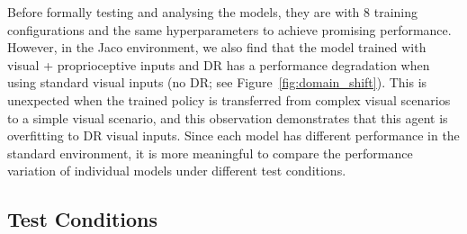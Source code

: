 Before formally testing and analysing the models, they are  with 8 training configurations and the same hyperparameters to achieve promising performance. However, in the Jaco environment, we also find that the model trained with visual + proprioceptive inputs and DR has a performance degradation when using standard visual inputs (no DR; see Figure~\ref{fig:domain_shift}). This is unexpected when the trained policy is transferred from complex visual scenarios to a simple visual scenario, and this observation demonstrates that this agent is overfitting to DR visual inputs. Since each model has different performance in the standard environment, it is more meaningful to compare the performance variation of individual models under different test conditions.

\subsection{Test Conditions}
